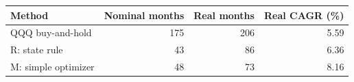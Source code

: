 \begin{tabular}{@{}lrrr@{}}\toprule
Method & Nominal months & Real months & Real CAGR (\%)\\\midrule
QQQ buy-and-hold & 175 & 206 & 5.59\\
R: state rule & 43 & 86 & 6.36\\
M: simple optimizer & 48 & 73 & 8.16\\
\bottomrule
\end{tabular}
